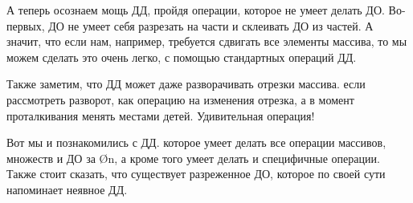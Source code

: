 А теперь осознаем мощь ДД, пройдя операции, которое не умеет делать ДО. Во-первых, ДО не умеет себя разрезать на части и склеивать ДО из частей. А значит, что если нам, например, требуется сдвигать все элементы массива, то мы можем сделать это очень легко, с помощью стандартных операций ДД.

Также заметим, что ДД может даже разворачивать отрезки массива. если рассмотреть разворот, как операцию на изменения отрезка, а в момент проталкивания менять местами детей. Удивительная операция!

Вот мы и познакомились с ДД. которое умеет делать все операции массивов, множеств и ДО за \O{\log n}, а кроме того умеет делать и специфичные операции. Также стоит сказать, что существует разреженное ДО, которое по своей сути напоминает неявное ДД.

